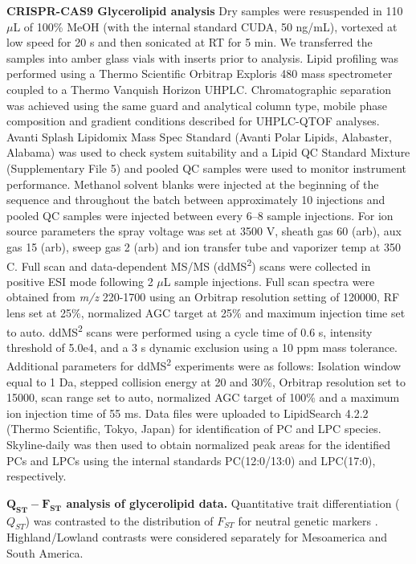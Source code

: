 \documentclass[9pt,twocolumn,twoside,lineno]{BioRxiv}
\begin{document}
\textbf{CRISPR-CAS9 Glycerolipid analysis}
Dry samples were resuspended in 110 $\mu$L of 100\% MeOH (with the internal standard CUDA, 50 ng/mL), vortexed at low speed for 20 s and then sonicated at RT for 5 min. We transferred the samples into amber glass vials with inserts prior to analysis. Lipid profiling was performed using a Thermo Scientific Orbitrap Exploris 480 mass spectrometer coupled to a Thermo Vanquish Horizon UHPLC. Chromatographic separation was achieved using the same guard and analytical column type, mobile phase composition and gradient conditions described for UHPLC-QTOF analyses. Avanti Splash Lipidomix Mass Spec Standard (Avanti Polar Lipids, Alabaster, Alabama) was used to check system suitability and a Lipid QC Standard Mixture (Supplementary File 5) and pooled QC samples were used to monitor instrument performance. Methanol solvent blanks were injected at the beginning of the sequence and throughout the batch between approximately 10 injections and pooled QC samples were injected between every 6–8 sample injections. For ion source parameters the spray voltage was set at 3500 V, sheath gas 60 (arb), aux gas 15 (arb), sweep gas 2 (arb) and ion transfer tube and vaporizer temp at 350 \degree C. Full scan and data-dependent MS/MS (ddMS\textsuperscript{2}) scans were collected in positive ESI mode following 2 $\mu$L sample injections. Full scan spectra were obtained from \textit{m/z} 220-1700 using an Orbitrap resolution setting of 120000, RF lens set at 25\%, normalized AGC target at 25\% and maximum injection time set to auto. ddMS\textsuperscript{2} scans were performed using a cycle time of 0.6 s, intensity threshold of 5.0e4, and a 3 s dynamic exclusion using a 10 ppm mass tolerance. Additional parameters for ddMS\textsuperscript{2} experiments were as follows: Isolation window equal to 1 Da, stepped collision energy at 20 and 30\%, Orbitrap resolution set to 15000, scan range set to auto, normalized AGC target of 100\% and a maximum ion injection time of 55 ms. Data files were uploaded to LipidSearch 4.2.2 (Thermo Scientific, Tokyo, Japan) for identification of PC and LPC species. Skyline-daily \cite{Adams2020-em} was then used to obtain normalized peak areas for the identified PCs and LPCs using the internal standards PC(12:0/13:0) and LPC(17:0), respectively.

\textbf{$\mathbf{Q_{ST}-F_{ST}}$ analysis of glycerolipid data.}
Quantitative trait differentiation ($Q_{ST}$) was contrasted to the distribution of $F_{ST}$ for neutral genetic markers \cite{whitlock2008evolutionary}.
Highland/Lowland contrasts were considered separately for Mesoamerica and South America.
\end{document}
